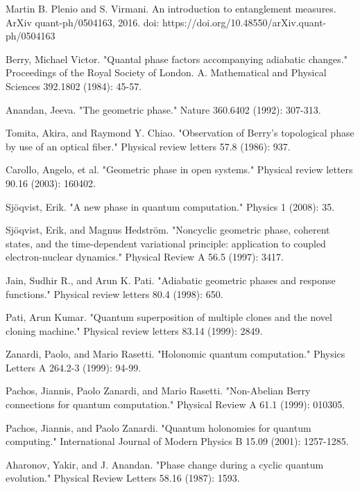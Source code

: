 \begin{thebibliography}{9}
Martin B. Plenio and S. Virmani. An introduction to entanglement measures. ArXiv quant-ph/0504163, 2016. doi: https://doi.org/10.48550/arXiv.quant-ph/0504163


Berry, Michael Victor. "Quantal phase factors accompanying adiabatic changes." Proceedings of the Royal Society of London. A. Mathematical and Physical Sciences 392.1802 (1984): 45-57.

Anandan, Jeeva. "The geometric phase." Nature 360.6402 (1992): 307-313.

Tomita, Akira, and Raymond Y. Chiao. "Observation of Berry's topological phase by use of an optical fiber." Physical review letters 57.8 (1986): 937.

Carollo, Angelo, et al. "Geometric phase in open systems." Physical review letters 90.16 (2003): 160402.

Sjöqvist, Erik. "A new phase in quantum computation." Physics 1 (2008): 35.

Sjöqvist, Erik, and Magnus Hedström. "Noncyclic geometric phase, coherent states, and the time-dependent variational principle: application to coupled electron-nuclear dynamics." Physical Review A 56.5 (1997): 3417.

Jain, Sudhir R., and Arun K. Pati. "Adiabatic geometric phases and response functions." Physical review letters 80.4 (1998): 650.

Pati, Arun Kumar. "Quantum superposition of multiple clones and the novel cloning machine." Physical review letters 83.14 (1999): 2849.

Zanardi, Paolo, and Mario Rasetti. "Holonomic quantum computation." Physics Letters A 264.2-3 (1999): 94-99.

Pachos, Jiannis, Paolo Zanardi, and Mario Rasetti. "Non-Abelian Berry connections for quantum computation." Physical Review A 61.1 (1999): 010305.

Pachos, Jiannis, and Paolo Zanardi. "Quantum holonomies for quantum computing." International Journal of Modern Physics B 15.09 (2001): 1257-1285.

Aharonov, Yakir, and J. Anandan. "Phase change during a cyclic quantum evolution." Physical Review Letters 58.16 (1987): 1593.


\end{thebibliography}
